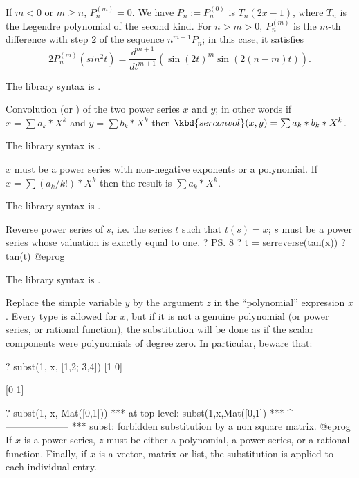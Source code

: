 If $m < 0$ or $m \ge n$, $P_n^{(m)} = 0$.
We have
$P_n := P_n^{(0)}$ is $T_n(2x-1)$, where $T_n$ is the Legendre polynomial of
the second kind. For $n > m > 0$, $P_n^{(m)}$ is the $m$-th difference with
step $2$ of the sequence $n^{m+1}P_n$; in this case, it satisfies
$$2 P_n^{(m)}(sin^2 t) = \dfrac{d^{m+1}}{dt^{m+1}}(\sin(2t)^m \sin(2(n-m)t)).$$


The library syntax is .

\label{se:serconvol}
Convolution (or ) of the
two power series $x$ and $y$; in other words if $x=\sum a_k*X^k$ and $y=\sum
b_k*X^k$ then $\kbd{serconvol}(x,y)=\sum a_k*b_k*X^k$.

The library syntax is .

\label{se:serlaplace}
$x$ must be a power series with non-negative
exponents or a polynomial. If $x=\sum (a_k/k!)*X^k$ then the result is $\sum
a_k*X^k$.

The library syntax is .

\label{se:serreverse}
Reverse power series of $s$, i.e. the series $t$ such that $t(s) = x$;
$s$ must be a power series whose valuation is exactly equal to one.
\bprog
? \ps 8
? t = serreverse(tan(x))
? tan(t)
@eprog

The library syntax is .

\label{se:subst}
Replace the simple variable $y$ by the argument $z$ in the ``polynomial''
expression $x$. Every type is allowed for $x$, but if it is not a genuine
polynomial (or power series, or rational function), the substitution will be
done as if the scalar components were polynomials of degree zero. In
particular, beware that:

\bprog
? subst(1, x, [1,2; 3,4])
[1 0]

[0 1]

? subst(1, x, Mat([0,1]))
  ***   at top-level: subst(1,x,Mat([0,1])
  ***                 ^--------------------
  *** subst: forbidden substitution by a non square matrix.
@eprog\noindent
If $x$ is a power series, $z$ must be either a polynomial, a power
series, or a rational function. Finally, if $x$ is a vector,
matrix or list, the substitution is applied to each individual entry.

